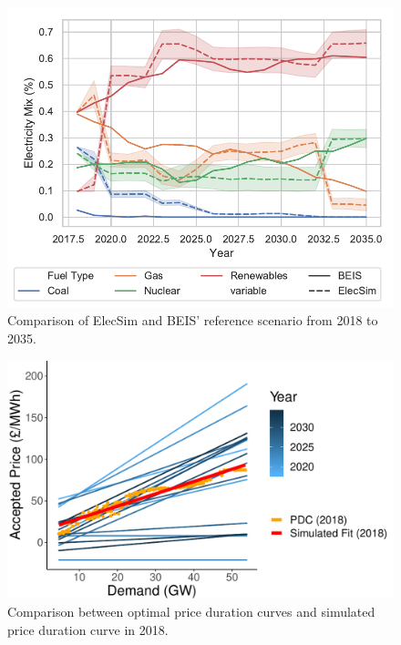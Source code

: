 \begin{figure}
	\centering
	\includegraphics[width=\textwidth]{Chapter4/figures/e-Energy-2020/results/scenario_analysis/best_forward_scenario_below_legend.pdf}
	\caption{Comparison of ElecSim and BEIS' reference scenario from 2018 to 2035.}
	\label{fig:forward_scenario_beis_elecsim}
\end{figure}



\begin{figure}
	\centering
	\includegraphics[width=\textwidth, height=0.6\textwidth, keepaspectratio]{Chapter4/figures/e-Energy-2020/results/scenario_analysis/optimal_pdc_prices.pdf}
	\caption{Comparison between optimal price duration curves and simulated price duration curve in 2018.}
	\label{fig:forward_scenario_best_pdcs}
\end{figure}


